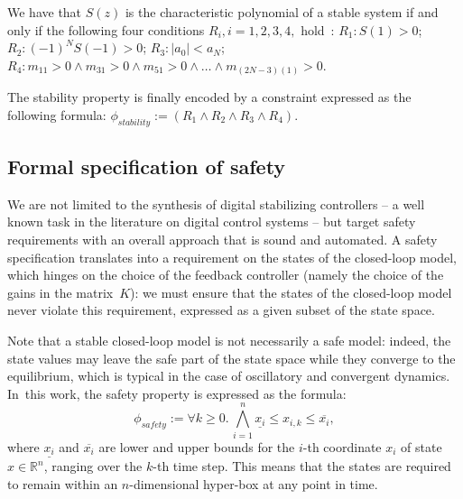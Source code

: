 \documentclass[twocolumn]{autart}    %
\newcommand{\addtodo}[1]{\textcolor{red}{[#1]}}
\begin{document}
We have that $S(z)$ is the characteristic polynomial of a stable system if and only if the following four conditions $R_i, i = 1,2,3,4,$ hold~\cite{astrom1997computer}:
$R_1: S(1) > 0$;
$R_2: (-1)^N S(-1) > 0$;
$R_3: |a_0| < a_N$;
$R_4: m_{11} > 0 \wedge\allowbreak
      m_{31}>0 \wedge\allowbreak
      m_{51}>0 \wedge \ldots \wedge\allowbreak
      m_{(2N{-}3)(1)}>0$.

The stability property is finally encoded by a constraint expressed as the following formula: 
$
\phi_\mathit{stability} := (R_1 \wedge R_2 \wedge R_3 \wedge R_4).
$


\subsection{Formal specification of safety} 
\label{ssec:safespecification}

We are not limited to the synthesis of digital stabilizing controllers -- a
well known task in the literature on digital control systems -- but target
safety requirements with an overall approach that is sound and automated. 
A safety specification translates into a requirement on the states of the closed-loop model, 
which hinges on the choice of the feedback controller (namely the choice of the gains in the matrix~$K$):  
we must ensure that the states of the closed-loop model never violate this requirement, expressed as a given subset of the state space.  

Note that a stable closed-loop model is not necessarily a safe model: 
indeed, the state values may leave the safe part of the state space while they converge
to the equilibrium, which is typical in the case of oscillatory and convergent dynamics. 
In~this work, the safety property is expressed as the formula:
%
\begin{equation}
\label{eq:safetyliteral}
\phi_\mathit{safety} := \forall k\ge 0.\, \bigwedge_{i=1}^{n}{\underline{x_{i}} \leq x_{i,k} \leq \overline{x_{i}}},
\end{equation}
%
%
where $\underline{x_{i}}$ and $\overline{x_{i}}$ are lower and upper bounds
for the $i$-th coordinate $x_{i}$ of state $x\in \mathbb R^n$, ranging over the $k$-th time step.  
This means that the states are required to remain within an $n$-dimensional hyper-box at any point in time.  	
\end{document}
